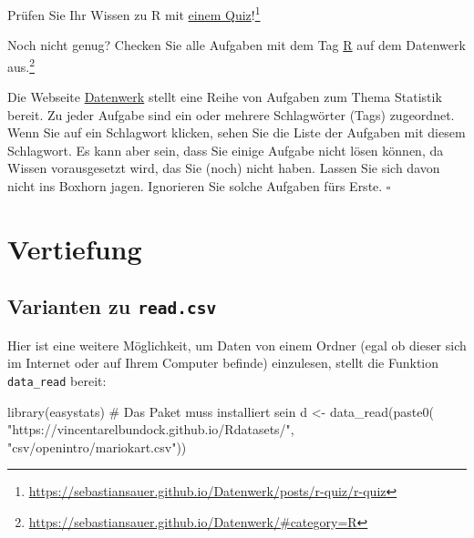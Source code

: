 \documentclass[
  letterpaper,
]{scrbook}
\newenvironment{Shaded}{\begin{snugshade}}{\end{snugshade}}
\newcommand{\CommentTok}[1]{\textcolor[rgb]{0.37,0.37,0.37}{#1}}
\newcommand{\FunctionTok}[1]{\textcolor[rgb]{0.28,0.35,0.67}{#1}}
\newcommand{\NormalTok}[1]{\textcolor[rgb]{0.00,0.23,0.31}{#1}}
\newcommand{\OtherTok}[1]{\textcolor[rgb]{0.00,0.23,0.31}{#1}}
\newcommand{\StringTok}[1]{\textcolor[rgb]{0.13,0.47,0.30}{#1}}
\theoremstyle{definition}
\theoremstyle{definition}
\theoremstyle{definition}
\theoremstyle{remark}
\begin{document}
Prüfen Sie Ihr Wissen zu R mit
\href{https://sebastiansauer.github.io/Datenwerk/posts/r-quiz/r-quiz}{einem
Quiz}!\footnote{\url{https://sebastiansauer.github.io/Datenwerk/posts/r-quiz/r-quiz}}

Noch nicht genug? Checken Sie alle Aufgaben mit dem Tag
\href{https://sebastiansauer.github.io/Datenwerk/\#category=R}{R} auf
dem Datenwerk aus.\footnote{\url{https://sebastiansauer.github.io/Datenwerk/\#category=R}}

\begin{tcolorbox}[enhanced jigsaw, colbacktitle=quarto-callout-note-color!10!white, toptitle=1mm, colframe=quarto-callout-note-color-frame, breakable, toprule=.15mm, bottomrule=.15mm, bottomtitle=1mm, left=2mm, opacitybacktitle=0.6, colback=white, arc=.35mm, coltitle=black, title=\textcolor{quarto-callout-note-color}{\faInfo}\hspace{0.5em}{Hinweis}, opacityback=0, rightrule=.15mm, leftrule=.75mm, titlerule=0mm]

Die Webseite
\href{https://sebastiansauer.github.io/Datenwerk/}{Datenwerk} stellt
eine Reihe von Aufgaben zum Thema Statistik bereit. Zu jeder Aufgabe
sind ein oder mehrere Schlagwörter (Tags) zugeordnet. Wenn Sie auf ein
Schlagwort klicken, sehen Sie die Liste der Aufgaben mit diesem
Schlagwort. Es kann aber sein, dass Sie einige Aufgabe nicht lösen
können, da Wissen vorausgesetzt wird, das Sie (noch) nicht haben. Lassen
Sie sich davon nicht ins Boxhorn jagen. Ignorieren Sie solche Aufgaben
fürs Erste. \(\square\)

\end{tcolorbox}

\section{Vertiefung}\label{vertiefung-2}

\subsection{\texorpdfstring{Varianten zu
\texttt{read.csv}}{Varianten zu read.csv}}\label{varianten-zu-read.csv}

Hier ist eine weitere Möglichkeit, um Daten von einem Ordner (egal ob
dieser sich im Internet oder auf Ihrem Computer befinde) einzulesen,
stellt die Funktion \texttt{data\_read} bereit:

\begin{Shaded}
\begin{Highlighting}[]
\FunctionTok{library}\NormalTok{(easystats)  }\CommentTok{\# Das Paket muss installiert sein}
\NormalTok{d }\OtherTok{\textless{}{-}} \FunctionTok{data\_read}\NormalTok{(}\FunctionTok{paste0}\NormalTok{(}
  \StringTok{"https://vincentarelbundock.github.io/Rdatasets/"}\NormalTok{,}
  \StringTok{"csv/openintro/mariokart.csv"}\NormalTok{))}
\end{Highlighting}
\end{Shaded}
\end{document}
